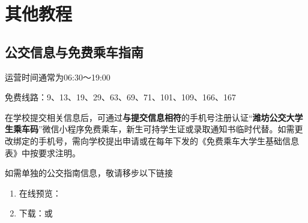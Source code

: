 \section[其他教程]{其他教程}
\subsection[公交信息与免费乘车指南]{公交信息与免费乘车指南}
\label{free_bus}
运营时间通常为06:30～19:00

免费线路\footnotemark：9、13、19、29、63、69、71、101、109、166、167

在学校提交相关信息后，可通过\textbf{与提交信息相符}的手机号注册认证“\textbf{潍坊公交大学生乘车码}”微信小程序免费乘车，新生可持学生证或录取通知书临时代替。如需更改绑定的手机号，需向学校提出申请或在每年下发的《免费乘车大学生基础信息表》中按要求注明。

如需单独的公交指南信息，敬请移步以下链接
\begin{enumerate}
    \item 在线预览：
    \item 下载：或
\end{enumerate}

